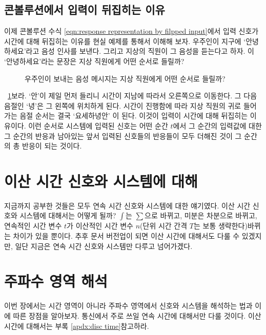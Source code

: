 \subsection{콘볼루션에서 입력이 뒤집히는 이유}
이제 콘볼루션 수식 \ref{eqn:response representation by filpped input}에서 입력 신호가 시간에 대해 뒤집히는 이유를 현실 예제를 통해서 이해해 보자. 우주인이 지구에 `안녕하세요'라고 음성 인사를 보낸다. 그리고 지상의 직원이 그 음성을 듣는다고 하자.
이 `안녕하세요'라는 문장은 지상 직원에게 어떤 순서로 들릴까?
\begin{figure}
    \centering
    \caption{우주인이 보내는 음성 메시지는 지상 직원에게 어떤 순서로 들릴까?}\label{fig:why signal flipped}
\end{figure}
\figurename~\ref{fig:why signal flipped}\을 보라. `안'이 제일 먼저 들리니 시간이 지남에 따라서 오른쪽으로 이동한다. 그 다음 음절인 `녕'은 그 왼쪽에 위치하게 된다.
시간이 진행함에 따라 지상 직원의 귀로 들어가는 음절 순서는 결국 `요세하녕안' 이 된다. 이것이 입력이 시간에 대해 뒤집히는 이유이다.
이런 순서로 시스템에 입력된 신호는 어떤 순간 $t$에서 그 순간의 입력값에 대한 그 순간의 반응과 남아있는 앞서 입력된 신호들의 반응들이 모두 더해진 것이 그 순간의 총 반응이 되는 것이다.
\section{이산 시간 신호와 시스템에 대해}
지금까지 공부한 것들은 모두 연속 시간 신호와 시스템에 대한 얘기였다. 이산 시간 신호와 시스템에 대해서는 어떻게 될까?
$\int$는 $\sum$으로 바뀌고, 미분은 차분으로 바뀌고, 연속적인 시간 변수 $t$가 이산적인 시간 변수 $n$(단위 시간 간격 $T$는 보통 생략한다) 바뀌는 차이가 있을 뿐이다.
추후 문서 버전업이 되면 이산 시간에 대해서도 다룰 수 있겠지만, 일단 지금은 연속 시간 신호와 시스템만 다루고 넘어가겠다.

\section{주파수 영역 해석}\label{chap:freq domain analysis}
이번 장에서는 시간 영역이 아니라 주파수 영역에서 신호와 시스템을 해석하는 법과 이에 따른 장점을 알아보자. 통신에서 주로 쓰일 연속 시간에 대해서만 다룰 것이다.
이산 시간에 대해서는 부록 \ref{apdx:disc time}\을 참고하라.
